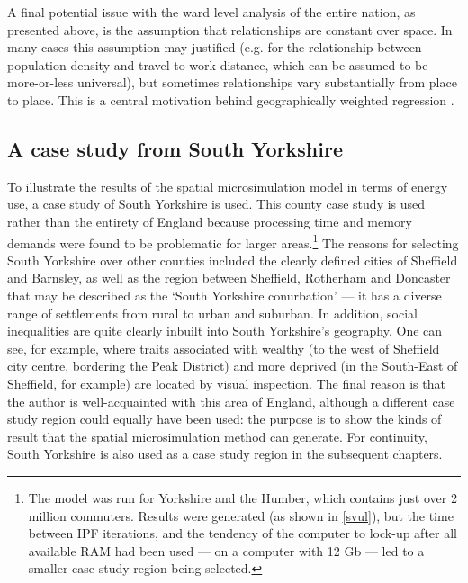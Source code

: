 A final potential issue with the ward level analysis of the entire nation, as presented
above, is the assumption that relationships are constant over space.
In many cases this assumption may justified (e.g. for the relationship between
population density and travel-to-work distance, which can be assumed to be
more-or-less universal), but sometimes relationships vary
substantially from place to place. This is a central motivation behind
geographically weighted regression \citep{Fotheringham2002}.

\subsection{A case study from South Yorkshire} \label{soyoref}
To illustrate the results of the spatial microsimulation model
in terms of energy use, a case study of South Yorkshire is used.
This county case study is used rather than the entirety of England because
processing time and memory demands were found to be problematic for
larger areas.\footnote{The
model was run for
Yorkshire and the Humber, which contains just over 2 million commuters.
Results were generated (as shown in \cref{svul}), but the time between
IPF iterations, and the tendency of the computer to lock-up after all
available RAM had been used --- on a computer with 12 Gb ---
led to a smaller case study region being selected.
}
The reasons for selecting South Yorkshire over other counties included the
clearly defined cities of Sheffield and Barnsley, as well as the region
between Sheffield, Rotherham and Doncaster that may be described as
the `South Yorkshire conurbation' \citep{barker1978perthes} --- it has
a diverse range of settlements from rural to urban and suburban.
In addition, social inequalities are quite clearly inbuilt into South Yorkshire's
geography. One can see, for example, where traits associated
with wealthy (to the west of Sheffield city centre, bordering
the Peak District) and more deprived (in the South-East of Sheffield,
for example) are located by visual inspection. The final reason
is that the author is well-acquainted with this area of England,
although a different case study region could equally have been used:
the purpose is to show the kinds of result that the
spatial microsimulation method can generate.
For continuity, 
South Yorkshire is also used as a case study region in the subsequent chapters.

